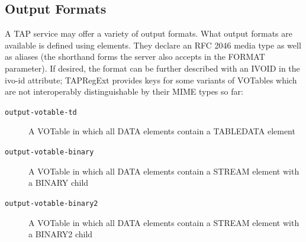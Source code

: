 \documentclass{ivoa}
\begin{document}

\subsection{Output Formats}

\label{outforms}

A TAP service may offer a variety of output formats.
What output formats are available is defined using
 elements.   They 
declare an RFC 2046 media type \citep{std:MIME} as well
as aliases (the shorthand forms the server also accepts in the 
FORMAT parameter).  If desired, the format can be further described with an
IVOID in the ivo-id attribute; TAPRegExt provides keys for some variants of
VOTables which are not interoperably distinguishable by their MIME types so far:


\begin{description}
\item[\normalfont\texttt{output-votable-td}]A VOTable in which all DATA elements contain a TABLEDATA element
\item[\normalfont\texttt{output-votable-binary}]A VOTable in which all DATA elements contain a STREAM element
	with a BINARY child
\item[\normalfont\texttt{output-votable-binary2}]A VOTable in which all DATA elements contain a STREAM element
	with a BINARY2 child
\end{description}
\end{document}
